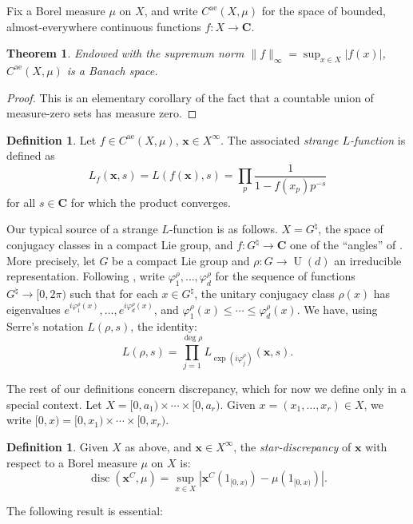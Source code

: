 \documentclass{article}
\DeclareMathOperator{\disc}{disc}
\DeclareMathOperator{\U}{U}
\newcommand{\bC}{\mathbf{C}}
\newcommand{\bx}{\boldsymbol{x}}
\newcommand{\alev}{\mathrm{ae}}
\newtheorem{theorem}[subsection]{Theorem}
\theoremstyle{definition}
\newtheorem{definition}[subsection]{Definition}
\begin{document}
Fix a Borel measure $\mu$ on $X$, and write $C^\alev(X,\mu)$ for the space of 
bounded, almost-everywhere continuous functions $f\colon X\to \bC$. 


\begin{theorem}
Endowed with the supremum norm $\|f\|_\infty=\sup_{x\in X} |f(x)|$, 
$C^\alev(X,\mu)$ is a Banach space. 
\end{theorem}
\begin{proof}
This is an elementary corollary of the fact that a countable union of 
measure-zero sets has measure zero. 
\end{proof}

\begin{definition}
Let $f\in C^\alev(X,\mu)$, $\bx\in X^\infty$. The associated \emph{strange 
$L$-function} is defined as 
\[
	L_f(\bx,s) = L(f(\bx),s) = \prod_p \frac{1}{1-f(x_p) p^{-s}} 
\]
for all $s\in \bC$ for which the product converges. 
\end{definition}

Our typical source of a strange $L$-function is as follows. $X=G^\natural$, the 
space of conjugacy classes in a compact Lie group, and 
$f\colon G^\natural\to \bC$ one of the ``angles'' of \cite{katz-sarnak-1999}. 
More precisely, let $G$ be a compact Lie group and $\rho\colon G\to \U(d)$ an 
irreducible representation. Following \cite[Le.~1.0.9]{katz-sarnak-1999}, write 
$\varphi_1^\rho,\dots,\varphi_d^\rho$ for the sequence of functions 
$G^\natural\to [0,2\pi)$ such that for each $x\in G^\natural$, the unitary 
conjugacy class $\rho(x)$ has eigenvalues 
$e^{i\varphi_1^\rho(x)},\dots,e^{i \varphi_d^\rho(x)}$, and 
$\varphi_1^\rho(x) \leqslant \cdots \leqslant \varphi_d^\rho(x)$. We have, 
using Serre's notation $L(\rho,s)$, the identity:
\[
	L(\rho,s) = \prod_{j=1}^{\deg\rho} L_{\exp(i\varphi_j^\rho)}(\bx,s) .
\]

The rest of our definitions concern discrepancy, which for now we define only 
in a special context. Let $X=[0,a_1)\times \cdots \times [0,a_r)$. Given 
$x=(x_1,\dots,x_r)\in X$, we write $[0,x)=[0,x_1)\times \cdots \times [0,x_r)$. 

\begin{definition}
Given $X$ as above, and $\bx\in X^\infty$, the \emph{star-discrepancy} of $\bx$ 
with respect to a Borel measure $\mu$ on $X$ is:
\[
	\disc(\bx^C,\mu) = \sup_{x\in X} \left|\bx^C(1_{[0,x)}) - \mu(1_{[0,x)})\right| .
\]
\end{definition}

The following result is essential:
\end{document}
